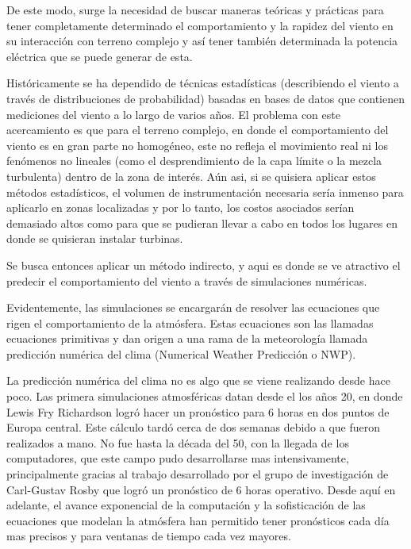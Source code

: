 De este modo, surge la necesidad de buscar maneras teóricas y prácticas para tener completamente determinado el comportamiento y la rapidez del viento en su interacción con terreno complejo y así tener también determinada la potencia eléctrica que se puede generar de esta.

Históricamente se ha dependido de técnicas estadísticas (describiendo el viento a través de distribuciones de probabilidad) basadas en bases de datos que contienen mediciones del viento a lo largo de varios años. El problema con este acercamiento es que para el terreno complejo, en donde el comportamiento del viento es en gran parte no homogéneo, este no refleja el movimiento real ni los fenómenos no lineales (como el desprendimiento de la capa límite o la mezcla turbulenta) dentro de la zona de interés. Aún asi, si se quisiera aplicar estos métodos estadísticos, el volumen de instrumentación necesaria sería inmenso para aplicarlo en zonas localizadas y por lo tanto, los costos asociados serían demasiado altos como para que se pudieran llevar a cabo en todos los lugares en donde se quisieran instalar turbinas.

Se busca entonces aplicar un método indirecto, y aqui es donde se ve atractivo el predecir el comportamiento del viento a través de simulaciones numéricas. 

Evidentemente, las simulaciones se encargarán de resolver las ecuaciones que rigen el comportamiento de la atmósfera. Estas ecuaciones son las llamadas ecuaciones primitivas y dan origen a una rama de la meteorología llamada predicción numérica del clima (Numerical Weather Predicción o NWP).

La predicción numérica del clima no es algo que se viene realizando desde hace poco. Las primera simulaciones atmosféricas datan desde el los años 20, en donde Lewis Fry Richardson logró hacer un pronóstico para 6 horas en dos puntos de Europa central. Este cálculo tardó cerca de dos semanas debido a que fueron realizados a mano. No fue hasta la década del 50, con la llegada de los computadores, que este campo pudo desarrollarse mas intensivamente, principalmente gracias al trabajo desarrollado por el grupo de investigación de Carl-Gustav Rosby que logró un pronóstico de 6 horas operativo. Desde aquí en adelante, el avance exponencial de la computación y la sofisticación de las ecuaciones que modelan la atmósfera han permitido tener pronósticos cada día mas precisos y para ventanas de tiempo cada vez mayores. 

